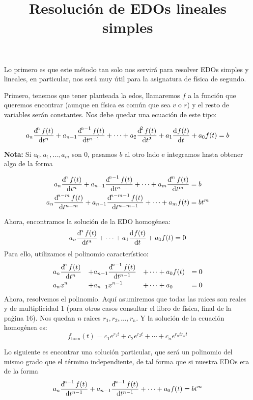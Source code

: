 \documentclass[a4paper]{article}
\newcommand{\dv}[3][]{\frac{\dif^{#1} #2}{\dif #3^{#1}}}
\begin{document}
\title{Resolución de EDOs lineales simples}
\date{}
\maketitle

Lo primero es que este método tan solo nos servirá para resolver EDOs 
simples y lineales, en particular, nos será muy útil para la asignatura
de física de segundo.

Primero, tenemos que tener planteada la edos, llamaremos $f$ a la función
que queremos encontrar (aunque en física es común que sea $v$ o $r$) y el resto
de variables serán constantes. Nos debe quedar una ecuación de este tipo:

\[
  a_n \dv[n]{f(t)}{t} +
  a_{n-1} \dv[n-1]{f(t)}{t} +
  \cdots + a_2 \dv[2]{f(t)}{t} + a_1 \dv{f(t)}{t}
  + a_0 f(t) = b
\]

\textbf{Nota:} Si $a_0, a_1, \dots, a_m$ son 0, pasamos $b$ al otro lado e integramos
hasta obtener algo de la forma

\[
  \begin{gathered}
    a_{n} \dv[n]{f(t)}{t} +
    a_{n-1} \dv[n-1]{f(t)}{t} +
    \cdots + a_m \dv[m]{f(t)}{t} = b
    \\
    a_{n} \dv[n-m]{f(t)}{t} +
    a_{n-1} \dv[n-m-1]{f(t)}{t} +
    \cdots + a_m f(t) = b t^m
  \end{gathered}
\]

Ahora, encontramos la solución de la EDO homogénea:
\[
  a_n \dv[n]{f(t)}{t} + \cdots + a_1 \dv{f(t)}{t} + a_0 f(t) = 0
\]
Para ello, utilizamos el polinomio característico:
\[
  \begin{aligned}
    & a_n \dv[n]{f(t)}{t} & + & a_{n-1} \dv[n-1]{f(t)}{t} & +
    \cdots & + a_0 f(t) & = 0 \\
    & a_n x^n & + & a_{n-1} x^{n-1} & + \cdots & + a_0 & = 0
  \end{aligned}
\]
Ahora, resolvemos el polinomio. Aquí asumiremos que todas las raices son reales
y de multiplicidad 1 (para otros casos consultar el libro de física, final de la paǵina 16).
Nos quedan $n$ raices $r_1, r_2, \dots, r_n$. Y la solución de la ecuación homogénea es:
\[
  f_{\text{hom}}(t) = c_1 e^{r_1 t} + c_2 e^{r_2 t} + \cdots + c_n e^{r_n tr_n t}
\]

Lo siguiente es encontrar una solución particular, que será un polinomio del mismo grado 
que el término independiente, de tal forma que si nuestra EDOs era de la forma
\[
  a_{n} \dv[n-1]{f(t)}{t} +
  a_{n-1} \dv[n-1]{f(t)}{t} +
  \cdots + a_0 f(t) = b t^m
\]
\end{document}
